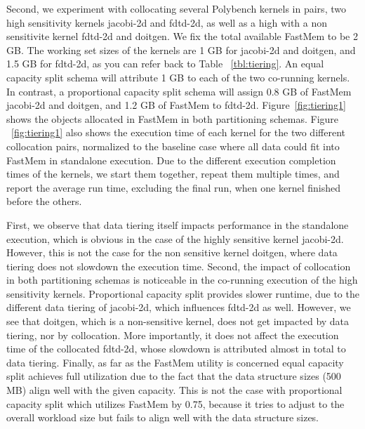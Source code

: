 \vspace{2ex}
\vspace{0.3ex} 

\noindent Second, we experiment with collocating several Polybench kernels in pairs, two high sensitivity kernels jacobi-2d and fdtd-2d, as well as a high with a non sensitivite kernel fdtd-2d and doitgen. We fix the total available FastMem to be 2 GB. The working set sizes of the kernels are 1 GB for jacobi-2d and doitgen, and 1.5 GB for fdtd-2d, as you can refer back to Table ~\ref{tbl:tiering}. 
An equal capacity split schema will attribute 1 GB to each of the two co-running kernels. In contrast, a proportional capacity split schema will assign 0.8 GB of FastMem jacobi-2d and doitgen, 
and 1.2 GB of FastMem to fdtd-2d. Figure~\ref{fig:tiering1} shows the objects allocated in FastMem in both partitioning schemas. Figure ~\ref{fig:tiering1} also shows the execution time of each kernel for the two different collocation pairs, normalized to the baseline case where all data could fit into FastMem in standalone execution. 
Due to the different execution completion times of the kernels, we start them together, repeat them multiple times, and report the average run time, excluding the final run, when one kernel finished before the others.

First, we observe that data tiering itself impacts performance in the standalone execution, which is obvious in the case of the highly sensitive kernel jacobi-2d. However, this is not the case for the non sensitive kernel doitgen, where data tiering does not slowdown the execution time.
Second, the impact of collocation in both partitioning schemas is noticeable in the co-running execution of the high sensitivity kernels. Proportional capacity split provides slower runtime, due to the different data tiering of jacobi-2d, which influences fdtd-2d as well. However, we see that doitgen, which is a 
non-sensitive kernel, does not get impacted by data tiering, nor by collocation. More importantly, it does not affect the execution time of the collocated fdtd-2d, whose slowdown is attributed almost in total to data tiering. Finally, as far as the FastMem utility is concerned equal capacity split achieves full utilization due to the fact that the data structure sizes (500 MB) align well with the given capacity. This is not the case with proportional capacity split which utilizes FastMem by 0.75, because it tries to adjust to the overall workload size but fails to align well with the data structure sizes. \\

